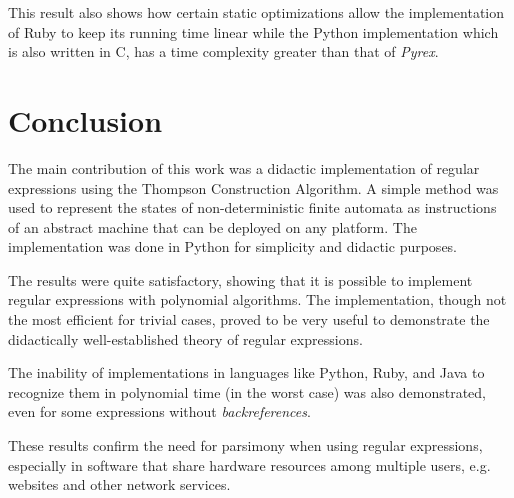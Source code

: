 \documentclass{llncs}
\begin{document}
This result also shows how certain static optimizations allow the implementation of Ruby to keep its running time linear while the Python implementation which is also written in C, has a time complexity greater than that of \emph{Pyrex}.


\section{Conclusion}

The main contribution of this work was a didactic implementation of regular expressions using the Thompson Construction Algorithm. A simple method was used to represent the states of non-deterministic finite automata as instructions of an abstract machine that can be deployed on any platform. The implementation was done in Python for simplicity and didactic purposes.

The results were quite satisfactory, showing that it is possible to implement regular expressions with polynomial algorithms. The implementation, though not the most efficient for trivial cases, proved to be very useful to demonstrate the didactically well-established theory of regular expressions. 

The inability of implementations in languages like Python, Ruby, and Java to recognize them in polynomial time (in the worst case) was also demonstrated, even for some expressions without \emph{backreferences}. 

These results confirm the need for parsimony when using regular expressions, especially in software that share hardware resources among multiple users, e.g. websites and other network services. 
\end{document}
